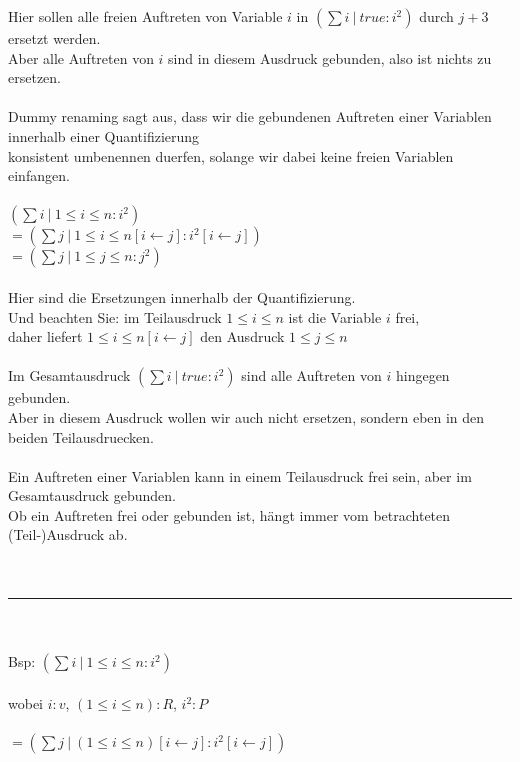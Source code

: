 \documentclass[18pt,a4paper]{article}
\begin{document}
Hier sollen alle freien Auftreten von Variable $i$ in $(\sum{i} \:\vert\: true : i^2)$ durch $j + 3$ ersetzt werden.\\
Aber alle Auftreten von $i$ sind in diesem Ausdruck gebunden, also ist nichts zu ersetzen.\\
\\
Dummy renaming sagt aus, dass wir die gebundenen Auftreten einer Variablen innerhalb einer Quantifizierung\\
konsistent umbenennen duerfen, solange wir dabei keine freien Variablen einfangen.\\
\\
$(\sum{i} \:\vert\: 1\leqslant i \leqslant n : i^2)$\\
$= (\sum{j} \:\vert\: 1\leqslant i \leqslant n[i \leftarrow j]: i^2[i \leftarrow j])$\\
$= (\sum{j} \:\vert\: 1\leqslant j \leqslant n : j^2)$\\
\\
Hier sind die Ersetzungen innerhalb der Quantifizierung.\\  
Und beachten Sie: im Teilausdruck $1\leqslant i\leqslant n$ ist die Variable $i$ frei,\\
daher liefert $1\leqslant i\leqslant n[i \leftarrow j]$ den Ausdruck $1\leqslant j\leqslant n$\\
\\
Im Gesamtausdruck $(\sum{i} \:\vert\: true : i^2)$ sind alle Auftreten von $i$ hingegen gebunden.\\
Aber in diesem Ausdruck wollen wir auch nicht ersetzen, sondern eben in den beiden Teilausdruecken.\\
\\
Ein Auftreten einer Variablen kann in einem Teilausdruck frei sein, aber im Gesamtausdruck gebunden.\\
Ob ein Auftreten frei oder gebunden ist, hängt immer vom betrachteten (Teil-)Ausdruck ab.\\
\\
\\
\rule{\textwidth}{0.4mm}\\
\\
Bsp: $(\sum{i} \:\vert\: 1\leqslant i\leqslant n : i^2 )$\\
\\
wobei $i: v$, $(1\leqslant i\leqslant n): R$, $i^2: P$\\
\\
$= (\sum{j} \:\vert\: (1\leqslant i\leqslant n)[i\leftarrow j] : i^2[i\leftarrow j] )$\\
\end{document}
